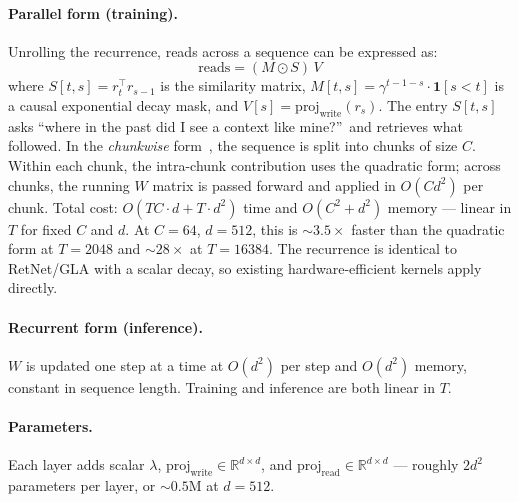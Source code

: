 \documentclass{article}
\begin{document}
\paragraph{Parallel form (training).}
Unrolling the recurrence, reads across a sequence can be expressed as:
\begin{equation}
    \text{reads} = (M \odot S)\, V
\end{equation}
where $S[t,s] = r_t^\top r_{s-1}$ is the similarity matrix, $M[t,s] = \gamma^{t-1-s} \cdot \mathbf{1}[s < t]$ is a causal exponential decay mask, and $V[s] = \text{proj}_\text{write}(r_s)$. The entry $S[t,s]$ asks ``where in the past did I see a context like mine?''\ and retrieves what followed. In the \emph{chunkwise} form~\citep{yang2023gated}, the sequence is split into chunks of size $C$. Within each chunk, the intra-chunk contribution uses the quadratic form; across chunks, the running $W$ matrix is passed forward and applied in $O(Cd^2)$ per chunk. Total cost: $O(TC \cdot d + T \cdot d^2)$ time and $O(C^2 + d^2)$ memory --- linear in $T$ for fixed $C$ and $d$. At $C{=}64$, $d{=}512$, this is ${\sim}3.5\times$ faster than the quadratic form at $T{=}2048$ and ${\sim}28\times$ at $T{=}16384$. The recurrence is identical to RetNet/GLA with a scalar decay, so existing hardware-efficient kernels apply directly.

\paragraph{Recurrent form (inference).}
$W$ is updated one step at a time at $O(d^2)$ per step and $O(d^2)$ memory, constant in sequence length. Training and inference are both linear in $T$.

\paragraph{Parameters.}
Each layer adds scalar $\lambda$, $\text{proj}_\text{write} \in \mathbb{R}^{d \times d}$, and $\text{proj}_\text{read} \in \mathbb{R}^{d \times d}$ --- roughly $2d^2$ parameters per layer, or ${\sim}0.5$M at $d=512$.
\end{document}
